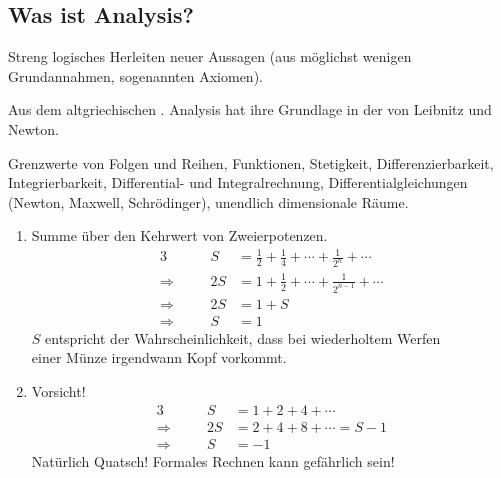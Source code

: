 \documentclass[../ana1.tex]{subfiles}
\begin{document}
\setcounter{section}{0}

\begin{prosa}

\section{Was ist Analysis?}

\begin{description}[style=nextline]
	\item[Mathematik]
		Streng logisches Herleiten neuer Aussagen (aus möglichst wenigen\\ Grundannahmen, sogenannten Axiomen).
	\item[Analysis]
		Aus dem altgriechischen . Analysis hat ihre Grundlage in der  \: von Leibnitz und Newton.
	\item[Zentrale Begriffe]
		Grenzwerte von Folgen und Reihen, Funktionen, Stetigkeit, Differenzierbarkeit, Integrierbarkeit, Differential- und Integralrechnung, Differentialgleichungen
		(Newton, Maxwell, Schrödinger), unendlich dimensionale Räume.
\end{description}

\begin{bspe}\leavevmode
	\begin{enumerate}[(1)]
		\item Summe über den Kehrwert von Zweierpotenzen.
			\begin{alignat*}{3}
							   &&             S &= \frac{1}{2} + \frac{1}{4} + \cdots + \frac{1}{2^{n}} + \cdots \\
				\Longrightarrow&\quad& 		 2S &= 1 + \frac{1}{2} + \cdots + \frac{1}{2^{n-1}} + \cdots \\
				\Longrightarrow&\quad& 	     2S &= 1 + S \\
				\Longrightarrow&&             S &= 1
			\end{alignat*}
			\(S\) entspricht der Wahrscheinlichkeit, dass bei wiederholtem Werfen \\
			einer Münze irgendwann Kopf vorkommt.\\
		\item Vorsicht!
			\begin{alignat*}{3}
							   &&       S &= 1 + 2 + 4 + \cdots \\
				\Longrightarrow&\quad& 2S &= 2 + 4 + 8 + \cdots = S - 1\\
				\Longrightarrow&\quad&  S &= \minus 1
			\end{alignat*}
			Natürlich Quatsch! Formales Rechnen kann gefährlich sein!
	\end{enumerate}
\end{bspe}


\end{prosa}
\end{document}
